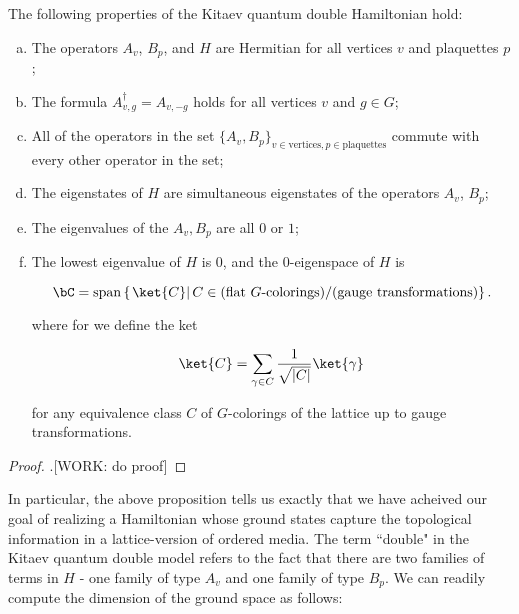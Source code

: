 \begin{prop} The following properties of the Kitaev quantum double Hamiltonian hold:

\begin{enumerate}[(a)]
\item The operators $A_v$, $B_p$, and $H$ are Hermitian for all vertices $v$ and plaquettes $p$;
\item The formula $A_{v,g}^{\dagger}=A_{v,-g}$ holds for all vertices $v$ and $g\in G$;
\item All of the operators in the set $\{A_v,B_p\}_{v\in \text{vertices}, p\in \text{plaquettes}}$ commute with every other operator in the set;
\item The eigenstates of $H$ are simultaneous eigenstates of the operators $A_v$, $B_p$;
\item The eigenvalues of the $A_v,B_p$ are all $0$ or $1$;
\item The lowest eigenvalue of $H$ is $0$, and the $0$-eigenspace of $H$ is

$$\bC=\text{span}\left\{\left.\ket{C}\right| C\in \text{(flat $G$-colorings)}/\text{(gauge transformations)}\right\}.$$

where for we define the ket

$$\ket{C}=\sum_{\gamma \in C}\frac{1}{\sqrt{|C|}}\ket{\gamma}$$

for any equivalence class $C$ of $G$-colorings of the lattice up to gauge transformations.

\end{enumerate}
\end{prop}
\begin{proof}.[WORK: do proof]
\end{proof}

In particular, the above proposition tells us exactly that we have acheived our goal of realizing a Hamiltonian whose ground states capture the topological information in a lattice-version of ordered media.  The term ``double" in the Kitaev quantum double model refers to the fact that there are two families of terms in $H$ - one family of type $A_v$ and one family of type $B_p$. We can readily compute the dimension of the ground space as follows:

